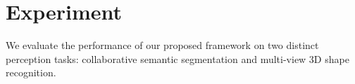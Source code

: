 \section{Experiment}
We evaluate the performance of our proposed framework on two distinct perception tasks: collaborative semantic segmentation and multi-view 3D shape recognition.  







































